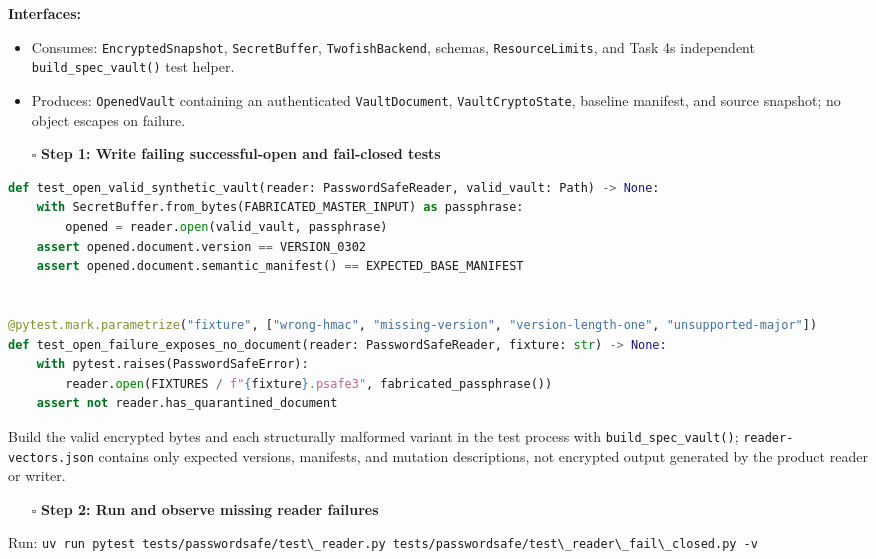 \documentclass[
  letterpaper,
]{article}
\newcommand{\passthrough}[1]{#1}
\providecommand{\tightlist}{%
  \setlength{\itemsep}{0pt}\setlength{\parskip}{0pt}}
\begin{document}
\textbf{Interfaces:}

\begin{itemize}
\tightlist
\item
  Consumes: \nolinkurl{EncryptedSnapshot}, \nolinkurl{SecretBuffer}, \nolinkurl{TwofishBackend}, schemas,
  \nolinkurl{ResourceLimits}, and Task 4\textquotesingle s independent \nolinkurl{build_spec_vault()} test helper.
\item
  Produces: \nolinkurl{OpenedVault} containing an authenticated \nolinkurl{VaultDocument}, \nolinkurl{VaultCryptoState},
  baseline manifest, and source snapshot; no object escapes on failure.
\end{itemize}

\begin{itemize}
\tightlist
\item[$\square$]
  \textbf{Step 1: Write failing successful-open and fail-closed tests}
\end{itemize}

\begin{lstlisting}[language=Python]
def test_open_valid_synthetic_vault(reader: PasswordSafeReader, valid_vault: Path) -> None:
    with SecretBuffer.from_bytes(FABRICATED_MASTER_INPUT) as passphrase:
        opened = reader.open(valid_vault, passphrase)
    assert opened.document.version == VERSION_0302
    assert opened.document.semantic_manifest() == EXPECTED_BASE_MANIFEST


@pytest.mark.parametrize("fixture", ["wrong-hmac", "missing-version", "version-length-one", "unsupported-major"])
def test_open_failure_exposes_no_document(reader: PasswordSafeReader, fixture: str) -> None:
    with pytest.raises(PasswordSafeError):
        reader.open(FIXTURES / f"{fixture}.psafe3", fabricated_passphrase())
    assert not reader.has_quarantined_document
\end{lstlisting}

Build the valid encrypted bytes and each structurally malformed variant in the test process with
\nolinkurl{build_spec_vault()}; \nolinkurl{reader-vectors.json} contains only expected versions, manifests, and mutation
descriptions, not encrypted output generated by the product reader or writer.

\begin{itemize}
\tightlist
\item[$\square$]
  \textbf{Step 2: Run and observe missing reader failures}
\end{itemize}

Run:
\passthrough{\lstinline!uv run pytest tests/passwordsafe/test\_reader.py tests/passwordsafe/test\_reader\_fail\_closed.py -v!}
\end{document}
